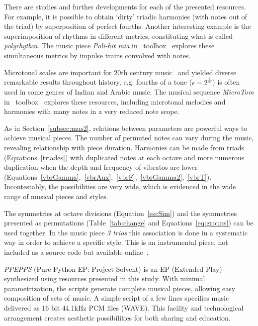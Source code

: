 There are studies and further developments for each of the presented resources.
For example, it is possible to obtain `dirty' triadic harmonies (with notes out of the triad) by superposition of perfect fourths.
Another interesting example is the superimposition of rhythms in different metrics, constituting what is
called \emph{polyrhythm}. The music piece \emph{Poli-hit mia} in \massa\ toolbox~\cite{MASSA} explores these simultaneous metrics by impulse trains convolved with notes.

Microtonal scales are important for 20th
century music~\cite{microtonalidade} and yielded diverse remarkable results throughout history, e.g.
fourths of a tone ($\epsilon=2^{\frac{1}{24}}$) is often used in some genres of Indian and Arabic music. The musical sequence \emph{MicroTom} in \massa\ toolbox~\cite{MASSA} explores these resources, including microtonal melodies and harmonies
with many notes in a very reduced note scope.

As in Section~\ref{subsec:mus2}, relations between
parameters are powerful ways to achieve musical pieces.
The number of permuted
notes can vary during the music, revealing relationship with piece
duration. Harmonies can be made from triads (Equations~\ref{triades}) with duplicated
notes at each octave and more numerous duplication when the depth and frequency of
vibratos are lower (Equations~\ref{vbrGamma},~\ref{vbrAux},~\ref{vbrF},~\ref{vbrGamma2},~\ref{vbrT}).
Incontestably, the possibilities are very wide, which is evidenced in the wide range of musical pieces and styles.

The symmetries at octave divisions (Equation~\ref{escSim}) and the
symmetries presented as permutations (Table~\ref{tab:change} and
Equations~\ref{eq:groups}) can be used together. In the music piece \emph{3 trios}
this association is done in a systematic way in order to achieve a specific style. This is an instrumental piece, not included as a source
code but available online~\cite{3Trios}.

\emph{PPEPPS} (Pure Python EP: Project Solvent) is an EP (Extended Play) synthesized using
resources presented in this study. With minimal parametrization, the scripts
generate complete musical pieces, allowing easy composition of sets of
music. A simple script of a few lines specifies music delivered as 16 bit
44.1kHz PCM files (WAVE). This facility and technological
arrangement creates aesthetic possibilities for both sharing and education.

